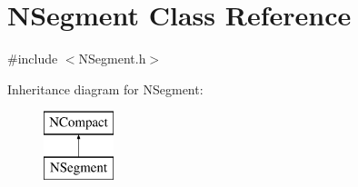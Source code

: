 \hypertarget{class_n_segment}{}\section{N\+Segment Class Reference}
\label{class_n_segment}


{\ttfamily \#include $<$N\+Segment.\+h$>$}

Inheritance diagram for N\+Segment\+:\begin{figure}[H]
\begin{center}
\leavevmode
\includegraphics[height=2.000000cm]{class_n_segment}
\end{center}
\end{figure}

